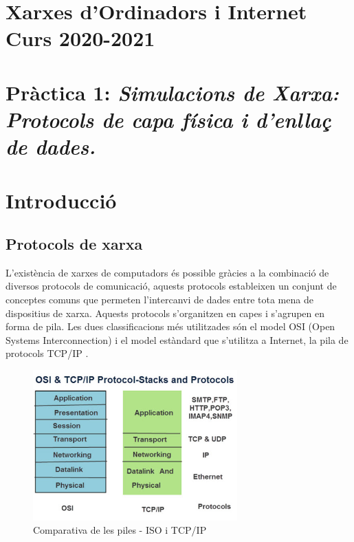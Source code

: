 \documentclass[12pt,a4paper]{article}
\begin{document}
\section*{Xarxes d’Ordinadors i Internet \\ Curs 2020-2021}
\section*{Pràctica 1: \textit{Simulacions de Xarxa: Protocols de capa física i d'enllaç de dades.}}

\vspace*{0.5cm}
\section{Introducció}


\subsection*{Protocols de xarxa}
L'existència de xarxes de computadors és possible gràcies a la combinació de diversos protocols de comunicació, aquests protocols estableixen un conjunt de conceptes comuns que permeten l'intercanvi de dades entre tota mena de dispositius de xarxa. Aquests protocols s'organitzen en capes i s'agrupen en forma de pila. Les dues classificacions més utilitzades són el model OSI (Open Systems Interconnection) \cite{osi} i el model estàndard que s'utilitza a Internet, la pila de protocols TCP/IP \cite{internet}.

\begin{figure}[!ht]
  \begin{center}
    \includegraphics[width=0.7\textwidth]{protocol-stack}
    \caption{Comparativa de les piles - ISO i TCP/IP}
    \label{osi-stack}
  \end{center}
\end{figure}
\end{document}
